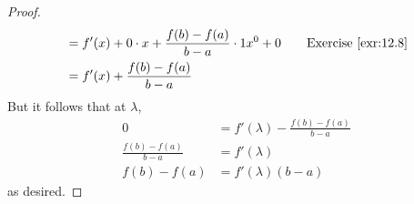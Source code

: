 \documentclass[../main.tex]{subfiles}
\begin{document}
\begin{corollary}
\begin{proof}
\begin{align*}
            &= f'(x)+0\cdot x+\frac{f(b)-f(a)}{b-a}\cdot 1x^0+0\tag*{Exercise \ref{exr:12.8}}\\
            &= f'(x)+\frac{f(b)-f(a)}{b-a}
        \end{align*}
        But it follows that at $\lambda$,
        \begin{align*}
            0 &= f'(\lambda)-\frac{f(b)-f(a)}{b-a}\\
            \frac{f(b)-f(a)}{b-a} &= f'(\lambda)\\
            f(b)-f(a) &= f'(\lambda)(b-a)
        \end{align*}
        as desired.
    \end{proof}
\end{corollary}
\end{document}
